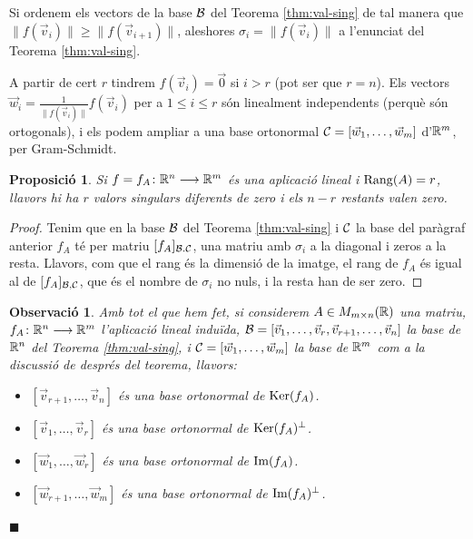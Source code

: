 \documentclass[
  11pt,
]{book}
\numberwithin{dummy}{section}
\theoremstyle{maincolornumbox}
\newtheorem{remarkT}{Observació}[chapter]
\theoremstyle{blacknumex}
\theoremstyle{blacknumbox}
\theoremstyle{maincolornum}
\newtheorem{propositionT}{Proposició}[chapter]
\newenvironment{proposition}{\begin{pBox}\begin{propositionT}}{\end{propositionT}\end{pBox}}
\newenvironment{remark}{\begin{remarkT}}{\hfill{\tiny\ensuremath{\blacksquare}}\end{remarkT}}
\newlength\esp
\begin{document}
Si ordenem els vectors de la base \(\mathcal{B}\) del Teorema
\ref{thm:val-sing} de tal manera que
\(\|f(\vec v_i)\|\geq \|f(\vec v_{i+1})\|\), aleshores
\(\sigma_i=\|f(\vec v_i)\|\) a l'enunciat del Teorema
\ref{thm:val-sing}.

A partir de cert \(r\) tindrem \(f(\vec v_i)=\vec 0\) si \(i>r\) (pot ser que
\(r=n\)). Els vectors \(\vec w_i=\frac{1}{\|f(\vec v_i)\|} f(\vec v_i)\) per
a \(1\leq i \leq r\) són linealment independents (perquè són ortogonals),
i els podem ampliar a una base ortonormal
\(\mathcal{C}=[\vec w_1, \dots, \vec w_m]\) d'\(\mathbb{R}^m\), per Gram-Schmidt.

\begin{proposition}
Si \(f=f_A\colon \mathbb{R}^n \longrightarrow \mathbb{R}^m\) és una aplicació lineal i \(\operatorname{Rang}(A)=r\),
llavors hi ha \(r\) valors singulars diferents de zero i els \(n-r\)
restants valen zero.
\end{proposition}

\begin{proof}
Tenim que en la base \(\mathcal{B}\) del Teorema
\ref{thm:val-sing} i \(\mathcal{C}\) la base del paràgraf anterior \(f_A\)
té per matriu \([f_A]_{\mathcal{B}.\mathcal{C}}\), una matriu amb \(\sigma_i\) a la
diagonal i zeros a la resta. Llavors, com que el rang és la dimensió de
la imatge, el rang de \(f_A\) és igual al de \([f_A]_{\mathcal{B},\mathcal{C}}\), que és
el nombre de \(\sigma_i\) no nuls, i la resta han de ser zero.
\end{proof}

\begin{remark}

Amb tot el que hem fet, si considerem \(A\in M_{m\times n}(\mathbb{R})\) una
matriu, \(f_A\colon \mathbb{R}^n\longrightarrow\mathbb{R}^m\) l'aplicació lineal induïda,
\(\mathcal{B}=[\vec v_1, \dots, \vec v_r, \vec v_{r+1}, \dots, \vec v_n]\) la
base de \(\mathbb{R}^n\) del Teorema
\ref{thm:val-sing}, i \(\mathcal{C}=[\vec w_1, \dots, \vec w_m]\) la base
de \(\mathbb{R}^m\) com a la discussió de després del teorema, llavors:

\begin{itemize}
\item
  \([\vec v_{r+1}, \dots,\vec v_n]\) és una base ortonormal de
  \(\operatorname{Ker}(f_A)\).
\item
  \([\vec v_{1}, \dots, \vec v_r]\) és una base ortonormal de
  \(\operatorname{Ker}(f_A)^\bot\).
\item
  \([\vec w_1,\dots,\vec w_r]\) és una base ortonormal de \(\operatorname{Im}(f_A)\).
\item
  \([\vec w_{r+1},\dots,\vec w_m]\) és una base ortonormal de
  \(\operatorname{Im}(f_A)^\bot\).
\end{itemize}

\end{remark}
\end{document}
